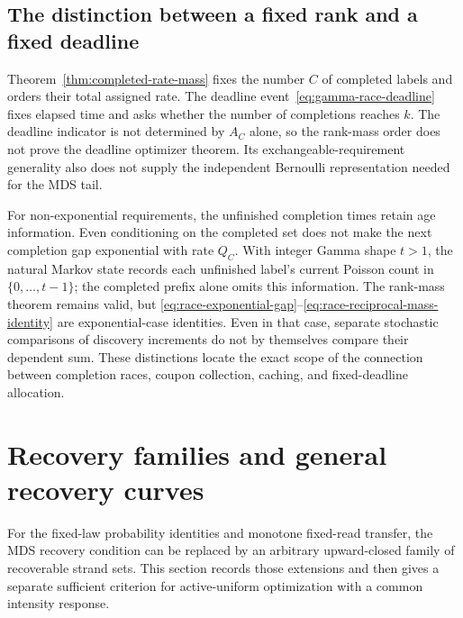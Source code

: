 \documentclass[11pt]{article}
\theoremstyle{definition}
\theoremstyle{remark}
\newcommand{\1}{\mathbf 1}
\begin{document}
\subsection{The distinction between a fixed rank and a fixed deadline}

Theorem~\ref{thm:completed-rate-mass} fixes the number \(C\) of
completed labels and orders their total assigned rate.  The
deadline event~\eqref{eq:gamma-race-deadline} fixes elapsed time and
asks whether the number of completions reaches \(k\).  The deadline
indicator is not determined by \(A_C\) alone, so the rank-mass
order does not prove the deadline optimizer theorem.  Its
exchangeable-requirement generality also does not supply the
independent Bernoulli representation needed for the MDS tail.

For non-exponential requirements, the unfinished completion times
retain age information.  Even conditioning on the completed set
does not make the next completion gap exponential with rate
\(Q_C\).  With integer Gamma shape \(t>1\), the natural Markov
state records each unfinished label's current Poisson count in
\(\{0,\ldots,t-1\}\); the completed prefix alone omits this
information.  The rank-mass theorem remains valid, but
\eqref{eq:race-exponential-gap}--\eqref{eq:race-reciprocal-mass-identity}
are exponential-case identities.  Even in that case, separate
stochastic comparisons of discovery increments do not by
themselves compare their dependent sum.  These distinctions locate
the exact scope of the connection between completion races,
coupon collection, caching, and fixed-deadline allocation.

\section{Recovery families and general recovery curves}

For the fixed-law probability identities and monotone fixed-read transfer, the MDS recovery condition can be replaced by an arbitrary upward-closed family of recoverable strand sets. This section records those extensions and then gives a separate sufficient criterion for active-uniform optimization with a common intensity response.
\end{document}
